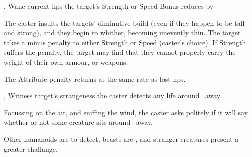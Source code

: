   {\mEarth,\mWater}%
  {Wane}%
  {\duplicated}%
  {current \glspl{hp}}%
  {the target's Strength or Speed Bonus reduces by }%
  {
    The caster insults the targets' diminutive build (even if they happen to be tall and strong), and they begin to whither, becoming unevently thin.
    The target takes a minus  penalty to either Strength or Speed (caster's choice).
    If Strength suffers the penalty, the target may find that they cannot properly carry the weight of their own armour, or weapons.

    The Attribute penalty returns at the same rate as lost \glspl{hp}.
  }

  {\mEarth,\mWater}%
  {Witness}%
  {\distant}%
  {target's strangeness}%
  {the caster detects any life around \spellRange\ away}%
  {
    Focussing on the air, and sniffing the wind, the caster asks politely if it will say whether or not some creature sits around \spellRange\ away.

    Other humanoids are \tn[7] to detect, beasts are \tn[9], and stranger creatures present a greater challange.
  }

